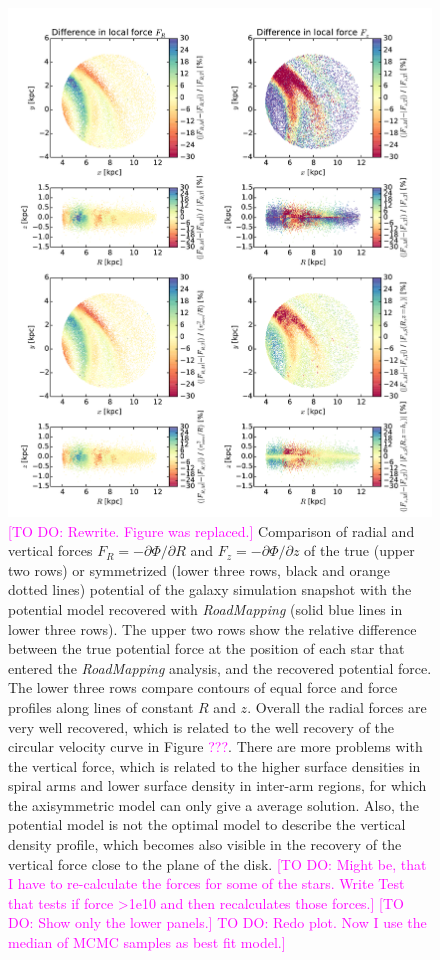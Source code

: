 \documentclass[iop,revtex4,numberedappendix,appendixfloats]{emulateapj}
\newcommand{\RM}{{\sl RoadMapping}}
\newcommand{\Wilma}[1]{\textcolor{Magenta}{#1}}
\begin{document}
\begin{figure}[!htbp]
\centering
\includegraphics[width=\columnwidth]{fig/MNdHHdiffSph2_4kpc8Spiral_a_test1_forces_overview_5.pdf}
\caption{\Wilma{[TO DO: Rewrite. Figure was replaced.]} Comparison of radial and vertical forces  $F_R=-\partial \Phi / \partial R$ and $F_z = -\partial \Phi / \partial z$ of the true (upper two rows) or symmetrized (lower three rows, black and orange dotted lines) potential of the galaxy simulation snapshot with the potential model recovered with \RM{} (solid blue lines in lower three rows). The upper two rows show the relative difference between the true potential force at the position of each star that entered the \RM{} analysis, and the recovered potential force. The lower three rows compare contours of equal force and force profiles along lines of constant $R$ and $z$. Overall the radial forces are very well recovered, which is related to the well recovery of the circular velocity curve in Figure \Wilma{???}. There are more problems with the vertical force, which is related to the higher surface densities in spiral arms and lower surface density in inter-arm regions, for which the axisymmetric model can only give a average solution. Also, the potential model is not the optimal model to describe the vertical density profile, which becomes also visible in the recovery of the vertical force close to the plane of the disk. \Wilma{[TO DO: Might be, that I have to re-calculate the forces for some of the stars. Write Test that tests if force >1e10 and then recalculates those forces.]} \Wilma{[TO DO: Show only the lower panels.]} \Wilma{TO DO: Redo plot. Now I use the median of MCMC samples as best fit model.]}}
\label{fig:4kpc8Spiral_forces}
\end{figure}
\end{document}
